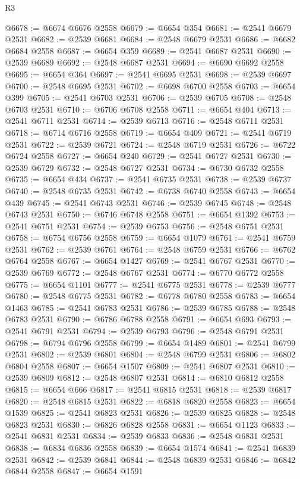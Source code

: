 \begin{lexlean}{R3}
\begin{coremodule}
@6678 := @6674 @6676 @2558
@6679 := @6654 @354
@6681 := @2541 @6679 @2531
@6682 := @2539 @6681
@6684 := @2548 @6679 @2531
@6686 := @6682 @6684 @2558
@6687 := @6654 @359
@6689 := @2541 @6687 @2531
@6690 := @2539 @6689
@6692 := @2548 @6687 @2531
@6694 := @6690 @6692 @2558
@6695 := @6654 @364
@6697 := @2541 @6695 @2531
@6698 := @2539 @6697
@6700 := @2548 @6695 @2531
@6702 := @6698 @6700 @2558
@6703 := @6654 @399
@6705 := @2541 @6703 @2531
@6706 := @2539 @6705
@6708 := @2548 @6703 @2531
@6710 := @6706 @6708 @2558
@6711 := @6654 @404
@6713 := @2541 @6711 @2531
@6714 := @2539 @6713
@6716 := @2548 @6711 @2531
@6718 := @6714 @6716 @2558
@6719 := @6654 @409
@6721 := @2541 @6719 @2531
@6722 := @2539 @6721
@6724 := @2548 @6719 @2531
@6726 := @6722 @6724 @2558
@6727 := @6654 @240
@6729 := @2541 @6727 @2531
@6730 := @2539 @6729
@6732 := @2548 @6727 @2531
@6734 := @6730 @6732 @2558
@6735 := @6654 @434
@6737 := @2541 @6735 @2531
@6738 := @2539 @6737
@6740 := @2548 @6735 @2531
@6742 := @6738 @6740 @2558
@6743 := @6654 @439
@6745 := @2541 @6743 @2531
@6746 := @2539 @6745
@6748 := @2548 @6743 @2531
@6750 := @6746 @6748 @2558
@6751 := @6654 @1392
@6753 := @2541 @6751 @2531
@6754 := @2539 @6753
@6756 := @2548 @6751 @2531
@6758 := @6754 @6756 @2558
@6759 := @6654 @1079
@6761 := @2541 @6759 @2531
@6762 := @2539 @6761
@6764 := @2548 @6759 @2531
@6766 := @6762 @6764 @2558
@6767 := @6654 @1427
@6769 := @2541 @6767 @2531
@6770 := @2539 @6769
@6772 := @2548 @6767 @2531
@6774 := @6770 @6772 @2558
@6775 := @6654 @1101
@6777 := @2541 @6775 @2531
@6778 := @2539 @6777
@6780 := @2548 @6775 @2531
@6782 := @6778 @6780 @2558
@6783 := @6654 @1463
@6785 := @2541 @6783 @2531
@6786 := @2539 @6785
@6788 := @2548 @6783 @2531
@6790 := @6786 @6788 @2558
@6791 := @6654 @693
@6793 := @2541 @6791 @2531
@6794 := @2539 @6793
@6796 := @2548 @6791 @2531
@6798 := @6794 @6796 @2558
@6799 := @6654 @1489
@6801 := @2541 @6799 @2531
@6802 := @2539 @6801
@6804 := @2548 @6799 @2531
@6806 := @6802 @6804 @2558
@6807 := @6654 @1507
@6809 := @2541 @6807 @2531
@6810 := @2539 @6809
@6812 := @2548 @6807 @2531
@6814 := @6810 @6812 @2558
@6815 := @6654 @666
@6817 := @2541 @6815 @2531
@6818 := @2539 @6817
@6820 := @2548 @6815 @2531
@6822 := @6818 @6820 @2558
@6823 := @6654 @1539
@6825 := @2541 @6823 @2531
@6826 := @2539 @6825
@6828 := @2548 @6823 @2531
@6830 := @6826 @6828 @2558
@6831 := @6654 @1123
@6833 := @2541 @6831 @2531
@6834 := @2539 @6833
@6836 := @2548 @6831 @2531
@6838 := @6834 @6836 @2558
@6839 := @6654 @1574
@6841 := @2541 @6839 @2531
@6842 := @2539 @6841
@6844 := @2548 @6839 @2531
@6846 := @6842 @6844 @2558
@6847 := @6654 @1591

\end{coremodule}
\end{lexlean}

